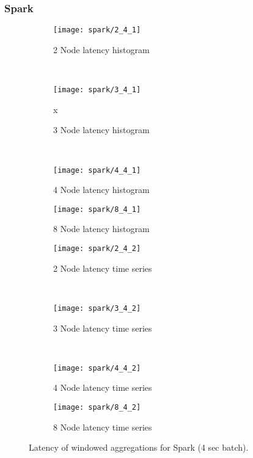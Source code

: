 \subsubsection{Spark}



\begin{figure*}
    \centering
    \begin{subfigure}[b]{0.49\textwidth}
        \texttt{[image: spark/2\_4\_1]}
        \caption{2 Node latency histogram}
    \end{subfigure}
    ~ %
    \begin{subfigure}[b]{0.49\textwidth}
        \texttt{[image: spark/3\_4\_1]}
        \caption{3 Node latency histogram}
x    \end{subfigure}
    ~ %
    \begin{subfigure}[b]{0.49\textwidth}
        \texttt{[image: spark/4\_4\_1]}
        \caption{4 Node latency histogram}
    \end{subfigure}
        \begin{subfigure}[b]{0.49\textwidth}
        \texttt{[image: spark/8\_4\_1]}
        \caption{8 Node latency histogram}
    \end{subfigure}


    \begin{subfigure}[b]{0.49\textwidth}
        \texttt{[image: spark/2\_4\_2]}
        \caption{2 Node latency time series}
    \end{subfigure}
    ~ %
    \begin{subfigure}[b]{0.49\textwidth}
        \texttt{[image: spark/3\_4\_2]}
        \caption{3 Node latency time series}
    \end{subfigure}
    ~ %
    \begin{subfigure}[b]{0.49\textwidth}
        \texttt{[image: spark/4\_4\_2]}
        \caption{4 Node latency time series}
    \end{subfigure}
        \begin{subfigure}[b]{0.49\textwidth}
        \texttt{[image: spark/8\_4\_2]}
        \caption{8 Node latency time series}
    \end{subfigure}

    \label{fig_flink_agg_1}
        \caption{Latency of windowed aggregations for Spark (4 sec batch).}
\end{figure*}





